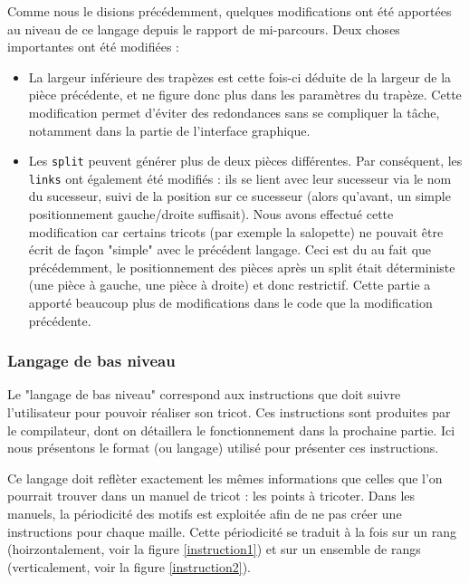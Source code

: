 \documentclass{article}
\begin{document}
Comme nous le disions précédemment, quelques modifications ont été
apportées au niveau de ce langage depuis le rapport de
mi-parcours. Deux choses importantes ont été modifiées :
\begin{itemize}
	\item La largeur inférieure des trapèzes est cette fois-ci
          déduite de la largeur de la pièce précédente, et ne figure
          donc plus dans les paramètres du trapèze. Cette modification
          permet d'éviter des redondances sans se compliquer la tâche,
          notamment dans la partie de l'interface graphique.
	\item Les \texttt{split} peuvent générer plus de deux pièces
          différentes. Par conséquent, les \texttt{links} ont
          également été modifiés : ils se lient avec leur sucesseur
          via le nom du sucesseur, suivi de la position sur ce
          sucesseur (alors qu'avant, un simple positionnement
          gauche/droite suffisait). Nous avons effectué cette
          modification car certains tricots (par exemple la salopette)
          ne pouvait être écrit de façon "simple" avec le précédent
          langage. Ceci est du au fait que précédemment, le
          positionnement des pièces après un split était déterministe
          (une pièce à gauche, une pièce à droite) et donc
          restrictif. Cette partie a apporté beaucoup plus de
          modifications dans le code que la modification précédente.
\end{itemize}

\subsubsection{Langage de bas niveau}

Le "langage de bas niveau" correspond aux instructions que doit suivre l'utilisateur 
pour pouvoir réaliser son tricot. Ces instructions sont produites par le compilateur, 
dont on détaillera le fonctionnement dans la prochaine partie. Ici nous présentons le 
format (ou langage) utilisé pour présenter ces instructions.

Ce langage doit reflèter exactement les mêmes informations que celles que l'on pourrait 
trouver dans un manuel de tricot : les points à tricoter. Dans les manuels, la périodicité 
des motifs est exploitée afin de ne pas créer une instructions pour chaque maille. Cette 
périodicité se traduit à la fois sur un rang (hoirzontalement, voir la figure \ref{instruction1}) 
et sur un ensemble de rangs (verticalement, voir la figure \ref{instruction2}).  
\end{document}
